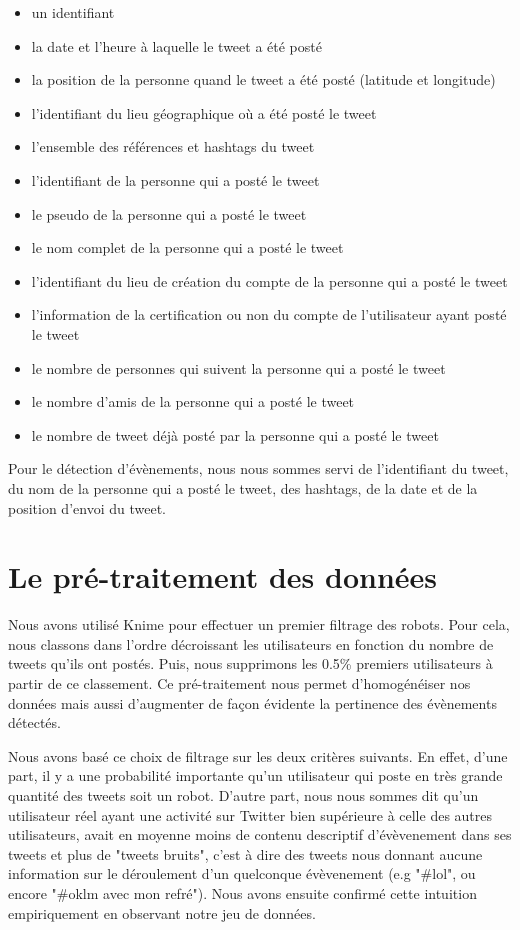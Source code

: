 \documentclass[12pt]{article}
\begin{document}
\begin{itemize}
	\item un identifiant
	\item la date et l'heure \`a laquelle le tweet a \'et\'e post\'e
	\item la position de la personne quand le tweet a \'et\'e post\'e (latitude et longitude)
	\item l'identifiant du lieu g\'eographique o\`u a \'et\'e post\'e le tweet
	\item l'ensemble des r\'ef\'erences et hashtags du tweet
	\item l'identifiant de la personne qui a post\'e le tweet
	\item le pseudo de la personne qui a post\'e le tweet
	\item le nom complet de la personne qui a post\'e le tweet
	\item l'identifiant du lieu de cr\'eation du compte de la personne qui a post\'e le tweet
	\item l'information de la certification ou non du compte de l'utilisateur ayant post\'e le tweet
	\item le nombre de personnes qui suivent la personne qui a post\'e le tweet
	\item le nombre d'amis de la personne qui a post\'e le tweet
	\item le nombre de tweet d\'ej\`a post\'e par la personne qui a post\'e le tweet
\end{itemize}

Pour le d\'etection d'\'ev\`enements, nous nous sommes servi de l'identifiant du tweet, du nom de la personne qui a post\'e le
tweet, des hashtags, de la date et de la position d'envoi du tweet.



\section{Le pr\'e-traitement des donn\'ees}

Nous avons utilis\'e Knime pour effectuer un premier filtrage des robots. Pour cela, nous classons dans l'ordre d\'ecroissant les utilisateurs en fonction du nombre de tweets qu'ils ont post\'es. Puis, nous supprimons les 0.5\% premiers utilisateurs \`{a} partir de ce classement. Ce pr\'e-traitement nous permet d'homog\'en\'eiser nos donn\'ees mais aussi d'augmenter de fa\c{c}on \'evidente la pertinence des \'ev\`enements d\'etect\'es. 

Nous avons bas\'e ce choix de filtrage sur les deux crit\`eres suivants. En effet, d'une part, il y a une probabilit\'e importante qu'un utilisateur qui poste en tr\`es grande quantit\'e des tweets soit un robot. D'autre part, nous nous sommes dit qu'un utilisateur r\'eel ayant une activit\'e sur Twitter bien sup\'erieure \`{a} celle des autres utilisateurs, avait en moyenne moins de contenu descriptif d'\'ev\`evenement dans ses tweets et plus de "tweets bruits", c'est \`{a} dire des tweets nous donnant aucune information sur le d\'eroulement d'un quelconque \'ev\`evenement (e.g "\#lol", ou encore "\#oklm avec mon refr\'e"). Nous avons ensuite confirm\'e cette intuition empiriquement en observant notre jeu de donn\'ees.  
\end{document}
